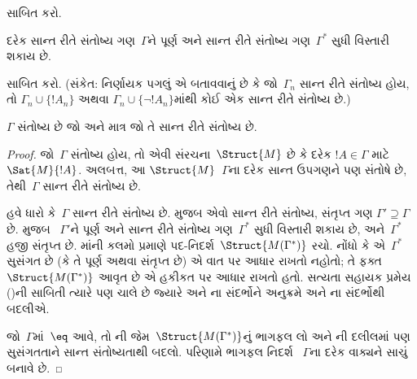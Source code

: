 \begin{prob}
 સાબિત કરો.
\end{prob}


\begin{lem}
 દરેક સાન્ત રીતે સંતોષ્ય ગણ~$\Gamma$ને
પૂર્ણ અને સાન્ત રીતે સંતોષ્ય ગણ~$\Gamma^*$ સુધી વિસ્તારી શકાય
છે.
\end{lem}


\begin{prob}
 સાબિત કરો. (સંકેત: નિર્ણાયક
પગલું એ બતાવવાનું છે કે જો~$\Gamma_n$ સાન્ત રીતે સંતોષ્ય હોય, તો
$\Gamma_n\cup\{!A_n\}$ અથવા $\Gamma_n\cup\{\lnot !A_n\}$માંથી કોઈ એક
સાન્ત રીતે સંતોષ્ય છે.)
\end{prob}




\begin{thm}[સઘનતા]
 $\Gamma$ સંતોષ્ય છે જો અને માત્ર જો તે
સાન્ત રીતે સંતોષ્ય છે.
\end{thm}

\begin{proof}
જો~$\Gamma$ સંતોષ્ય હોય, તો એવી
સંરચના~$\Struct{M}$
છે કે દરેક $!A\in\Gamma$ માટે
$\Sat{M}{!A}$. અલબત્ત, આ
$\Struct{M}$~$\Gamma$ના દરેક સાન્ત ઉપગણને
પણ સંતોષે છે, તેથી~$\Gamma$ સાન્ત રીતે સંતોષ્ય છે.

હવે ધારો કે~$\Gamma$ સાન્ત રીતે સંતોષ્ય છે.
   મુજબ એવો સાન્ત રીતે સંતોષ્ય, સંતૃપ્ત ગણ
  $\Gamma'\supseteq\Gamma$ છે.  મુજબ
~$\Gamma'$ને પૂર્ણ અને સાન્ત રીતે સંતોષ્ય
ગણ~$\Gamma^*$ સુધી વિસ્તારી શકાય છે, અને~$\Gamma^*$ હજી
સંતૃપ્ત છે. માંની કલમો પ્રમાણે
પદ-નિદર્શ~$\Struct{M(\Gamma^*)}$ રચો. નોંધો કે
 એ~$\Gamma^*$ સુસંગત છે (કે તે
પૂર્ણ અથવા સંતૃપ્ત છે) એ વાત પર આધાર રાખતો નહોતો; તે ફક્ત
$\Struct{M(\Gamma^*)}$ આવૃત છે એ હકીકત પર આધાર રાખતો હતો.
સત્યતા સહાયક પ્રમેય ()ની સાબિતી ત્યારે પણ ચાલે
છે જ્યારે  અને
ના સંદર્ભોને અનુક્રમે
 અને ના સંદર્ભોથી
બદલીએ.

જો~$\Gamma$માં~$\eq$ આવે, તો
ની જેમ~$\Struct{M(\Gamma^*)}$નું
ભાગફલ લો અને ની દલીલમાં પણ સુસંગતતાને
સાન્ત સંતોષ્યતાથી બદલો. પરિણામે ભાગફલ નિદર્શ
~$\Gamma$ના દરેક વાક્યને સાચું બનાવે છે.
\end{proof}


